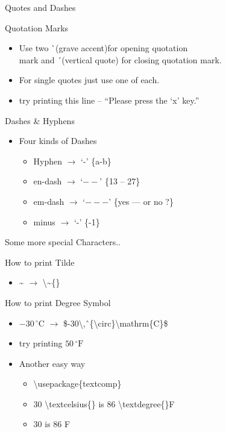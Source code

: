 \documentclass{beamer}
\begin{document}
\begin{frame}{Quotes and Dashes}
\begin{block}{Quotation Marks}
\begin{itemize}
\pause \item Use two \`\ (grave accent)for opening quotation \\ mark and \'\ (vertical quote) for closing quotation mark.
\pause \item For single quotes just use one of each.
\pause \item try printing this line -- ``Please press the `x' key.''
\end{itemize}
\end{block}
\begin{block}{Dashes \& Hyphens}
\begin{itemize}
\pause \item Four kinds of Dashes
\begin{itemize}
\pause \item Hyphen $\rightarrow$ `-' \{a-b\}
\pause \item en-dash $\rightarrow$ `$--$' \{13 -- 27\}
\pause \item em-dash $\rightarrow$ `$---$' \{yes --- or no ?\}
\pause \item minus $\rightarrow$ `-' \{-1\}
\end{itemize}
\end{itemize}
\end{block}
\end{frame}

\begin{frame}{Some more special Characters..}
\begin{block}{How to print Tilde}
\begin{itemize}
\pause \item \~{} $\rightarrow$ \textbackslash\~{}\{\}
\end{itemize}
\end{block}
\begin{block}{How to print Degree Symbol}
\begin{itemize}
\pause \item $-30\,^{\circ}\mathrm{C}$  $\rightarrow$ \$-30\textbackslash,\^\ \{\textbackslash circ\}\textbackslash mathrm\{C\}\$
\pause \item try printing $50\,^{\circ}\mathrm{F}$
\pause \item Another easy way
\begin{itemize}
\pause \item \textbackslash usepackage\{textcomp\}
\pause \item 30 \textbackslash textcelsius\{\} is 86 \textbackslash textdegree\{\}F
\pause \item 30 \textcelsius{} is 86 \textdegree{}F
\end{itemize}
\end{itemize}
\end{block}
\end{frame}
\end{document}

